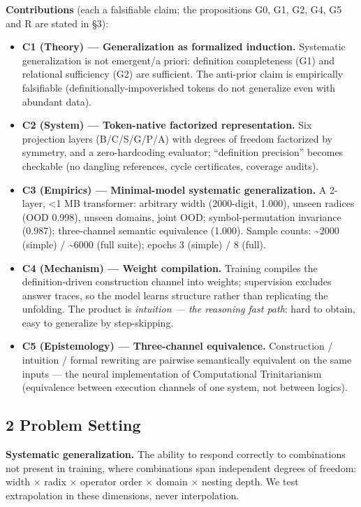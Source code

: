 \documentclass[
]{article}
\providecommand{\tightlist}{%
  \setlength{\itemsep}{0pt}\setlength{\parskip}{0pt}}
\begin{document}
\textbf{Contributions} (each a falsifiable claim; the propositions G0,
G1, G2, G4, G5 and R are stated in §3):

\begin{itemize}
\tightlist
\item
  \textbf{C1 (Theory) --- Generalization as formalized induction.}
  Systematic generalization is not emergent/a priori: definition
  completeness (G1) and relational sufficiency (G2) are sufficient. The
  anti-prior claim is empirically falsifiable
  (definitionally-impoverished tokens do not generalize even with
  abundant data).
\item
  \textbf{C2 (System) --- Token-native factorized representation.} Six
  projection layers (B/C/S/G/P/A) with degrees of freedom factorized by
  symmetry, and a zero-hardcoding evaluator; ``definition precision''
  becomes checkable (no dangling references, cycle certificates,
  coverage audits).
\item
  \textbf{C3 (Empirics) --- Minimal-model systematic generalization.} A
  2-layer, \textless1 MB transformer: arbitrary width (2000-digit,
  1.000), unseen radices (OOD 0.998), unseen domains, joint OOD;
  symbol-permutation invariance (0.987); three-channel semantic
  equivalence (1.000). Sample counts: \textasciitilde2000 (simple) /
  \textasciitilde6000 (full suite); epochs 3 (simple) / 8 (full).
\item
  \textbf{C4 (Mechanism) --- Weight compilation.} Training compiles the
  definition-driven construction channel into weights; supervision
  excludes answer traces, so the model learns structure rather than
  replicating the unfolding. The product is \emph{intuition --- the
  reasoning fast path}: hard to obtain, easy to generalize by
  step-skipping.
\item
  \textbf{C5 (Epistemology) --- Three-channel equivalence.} Construction
  / intuition / formal rewriting are pairwise semantically equivalent on
  the same inputs --- the neural implementation of Computational
  Trinitarianism (equivalence between execution channels of one system,
  not between logics).
\end{itemize}

\subsection{2 Problem Setting}\label{problem-setting}

\textbf{Systematic generalization.} The ability to respond correctly to
combinations not present in training, where combinations span
independent degrees of freedom: width × radix × operator order × domain
× nesting depth. We test extrapolation in these dimensions, never
interpolation.
\end{document}
